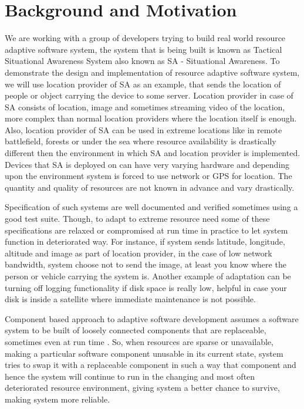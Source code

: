 \section{Background and Motivation}

We are working with a group of developers trying to build real world resource adaptive software system, the system that is being built is known as Tactical Situational Awareness System also known as SA - Situational Awareness. To demonstrate the design and implementation of resource adaptive software system, we will use location provider of SA as an example, that sends the location of people or object carrying the device to some server. Location provider in case of SA consists of location, image and sometimes streaming video of the location, more complex than normal location providers where the location itself is enough. Also, location provider of SA can be used in extreme locations like in remote battlefield, forests or under the sea where resource availability is drastically different then the environment in which SA and location provider is implemented. Devices that SA is deployed on can have very varying hardware and depending upon the environment system is forced to use network or GPS for location. The quantity and quality of resources are not known in advance and vary drastically.

Specification of such systems are well documented and verified sometimes using a good test suite. Though, to adapt to extreme resource need some of these specifications are relaxed or compromised at run time in practice to let system function in deteriorated way. For instance, if system sends latitude, longitude, altitude and image as part of location provider, in the case of low network bandwidth, system choose not to send the image, at least you know where the person or vehicle carrying the system is. Another example of adaptation can be turning off logging functionality if disk space is really low, helpful in case your disk is inside a satellite where immediate maintenance is not possible.

Component based approach to adaptive software development assumes a software system to be built of loosely connected components that are replaceable, sometimes even at run time \cite{architectureBasedAdaptation}. So, when resources are sparse or unavailable, making a particular software component unusable in its current state, system tries to swap it with a replaceable component in such a way that component and hence the system will continue to run in the changing and most often deteriorated resource environment, giving system a better chance to survive, making system more reliable.

